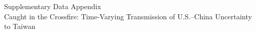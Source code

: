 \documentclass[12pt]{article}
\begin{document}
\begin{center}
{\Large Supplementary Data Appendix}\\[0.5em]
{\large Caught in the Crossfire: Time-Varying Transmission of U.S.--China Uncertainty to Taiwan}
\end{center}


\end{document}
